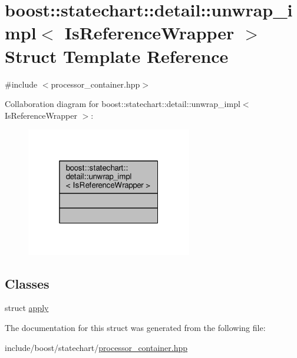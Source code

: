 \hypertarget{structboost_1_1statechart_1_1detail_1_1unwrap__impl}{}\section{boost\+:\+:statechart\+:\+:detail\+:\+:unwrap\+\_\+impl$<$ Is\+Reference\+Wrapper $>$ Struct Template Reference}
\label{structboost_1_1statechart_1_1detail_1_1unwrap__impl}


{\ttfamily \#include $<$processor\+\_\+container.\+hpp$>$}



Collaboration diagram for boost\+:\+:statechart\+:\+:detail\+:\+:unwrap\+\_\+impl$<$ Is\+Reference\+Wrapper $>$\+:
\nopagebreak
\begin{figure}[H]
\begin{center}
\leavevmode
\includegraphics[width=205pt]{structboost_1_1statechart_1_1detail_1_1unwrap__impl__coll__graph}
\end{center}
\end{figure}
\subsection*{Classes}
\begin{DoxyCompactItemize}
\item 
struct \mbox{\hyperlink{structboost_1_1statechart_1_1detail_1_1unwrap__impl_1_1apply}{apply}}
\end{DoxyCompactItemize}


The documentation for this struct was generated from the following file\+:\begin{DoxyCompactItemize}
\item 
include/boost/statechart/\mbox{\hyperlink{processor__container_8hpp}{processor\+\_\+container.\+hpp}}\end{DoxyCompactItemize}
